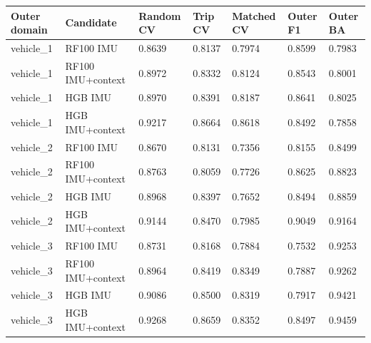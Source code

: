 \begin{singlespace}\small
\noindent\begin{minipage}{\linewidth}
\centering
{}
\begin{tabularx}{\linewidth}{XYYYYYY}
\toprule
Outer domain & Candidate & Random CV & Trip CV & Matched CV & Outer F1 & Outer BA \\
\midrule
vehicle\_1 & RF100 IMU & 0.8639 & 0.8137 & 0.7974 & 0.8599 & 0.7983 \\
vehicle\_1 & RF100 IMU+context & 0.8972 & 0.8332 & 0.8124 & 0.8543 & 0.8001 \\
vehicle\_1 & HGB IMU & 0.8970 & 0.8391 & 0.8187 & 0.8641 & 0.8025 \\
vehicle\_1 & HGB IMU+context & 0.9217 & 0.8664 & 0.8618 & 0.8492 & 0.7858 \\
vehicle\_2 & RF100 IMU & 0.8670 & 0.8131 & 0.7356 & 0.8155 & 0.8499 \\
vehicle\_2 & RF100 IMU+context & 0.8763 & 0.8059 & 0.7726 & 0.8625 & 0.8823 \\
vehicle\_2 & HGB IMU & 0.8968 & 0.8397 & 0.7652 & 0.8494 & 0.8859 \\
vehicle\_2 & HGB IMU+context & 0.9144 & 0.8470 & 0.7985 & 0.9049 & 0.9164 \\
vehicle\_3 & RF100 IMU & 0.8731 & 0.8168 & 0.7884 & 0.7532 & 0.9253 \\
vehicle\_3 & RF100 IMU+context & 0.8964 & 0.8419 & 0.8349 & 0.7887 & 0.9262 \\
vehicle\_3 & HGB IMU & 0.9086 & 0.8500 & 0.8319 & 0.7917 & 0.9421 \\
vehicle\_3 & HGB IMU+context & 0.9268 & 0.8659 & 0.8352 & 0.8497 & 0.9459 \\
\bottomrule
\end{tabularx}
\end{minipage}
\end{singlespace}
\par\medskip
\par\medskip
